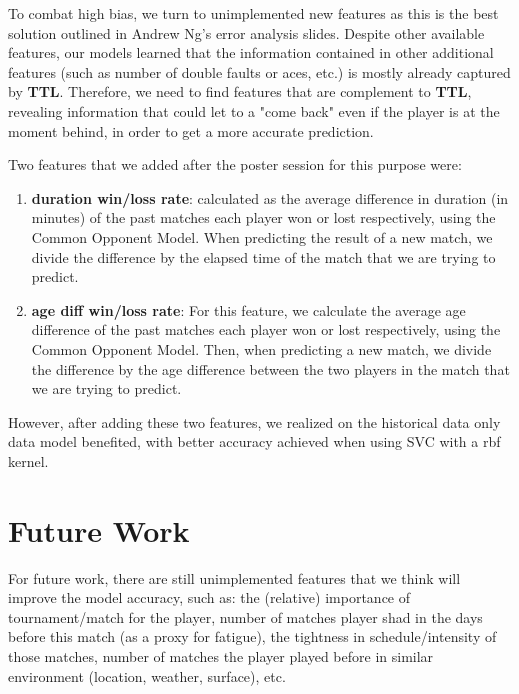 \documentclass[paper=a4, fontsize=10pt]{scrartcl} %
\numberwithin{equation}{section} %
\numberwithin{figure}{section} %
\numberwithin{table}{section} %
\begin{document}
To combat high bias, we turn to unimplemented new features as this is the best solution outlined in Andrew Ng's error analysis slides. Despite other available features, our models learned that the information contained in other additional features (such as number of double faults or aces, etc.) is mostly already captured by \textbf{TTL}.  Therefore, we need to find features that are complement to \textbf{TTL}, revealing information that could let to a "come back" even if the player is at the moment behind, in order to get a more accurate prediction.
 
Two features that we added after the poster session for this purpose were: \begin{enumerate}
\item \textbf{duration win/loss rate}: calculated as the average difference in duration (in minutes) of the past matches each player won or lost respectively, using the Common Opponent Model. When predicting the result of a new match, we divide the difference by the elapsed time of the match that we are trying to predict. 
\item \textbf{age diff win/loss rate}: For this feature, we calculate the average age difference of the past matches each player won or lost respectively, using the Common Opponent Model. Then, when predicting a new match, we divide the difference by the age difference between the two players in the match that we are trying to predict.
\end{enumerate}

However, after adding these two features, we realized on the historical data only data model benefited, with better accuracy achieved when using SVC with a rbf kernel. 
\section{Future Work}
For future work, there are still unimplemented features that we think will improve the model accuracy, such as: the (relative) importance of tournament/match for the player, number of matches player shad in the days before this match (as a proxy for fatigue), the tightness in schedule/intensity of those matches, number of matches the player played before in similar environment (location, weather, surface), etc.
\end{document}

